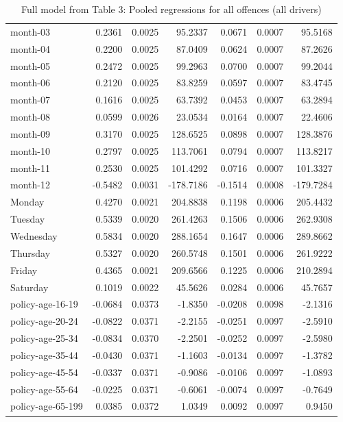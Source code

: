 \documentclass[10pt]{article}
\begin{document}
\begin{table}[ht]
\begin{tabular}{lrrrrrr}
  month-03 & 0.2361 & 0.0025 & 95.2337 & 0.0671 & 0.0007 & 95.5168 \\ 
  month-04 & 0.2200 & 0.0025 & 87.0409 & 0.0624 & 0.0007 & 87.2626 \\ 
  month-05 & 0.2472 & 0.0025 & 99.2963 & 0.0700 & 0.0007 & 99.2044 \\ 
  month-06 & 0.2120 & 0.0025 & 83.8259 & 0.0597 & 0.0007 & 83.4745 \\ 
  month-07 & 0.1616 & 0.0025 & 63.7392 & 0.0453 & 0.0007 & 63.2894 \\ 
  month-08 & 0.0599 & 0.0026 & 23.0534 & 0.0164 & 0.0007 & 22.4606 \\ 
  month-09 & 0.3170 & 0.0025 & 128.6525 & 0.0898 & 0.0007 & 128.3876 \\ 
  month-10 & 0.2797 & 0.0025 & 113.7061 & 0.0794 & 0.0007 & 113.8217 \\ 
  month-11 & 0.2530 & 0.0025 & 101.4292 & 0.0716 & 0.0007 & 101.3327 \\ 
  month-12 & -0.5482 & 0.0031 & -178.7186 & -0.1514 & 0.0008 & -179.7284 \\ 
  Monday & 0.4270 & 0.0021 & 204.8838 & 0.1198 & 0.0006 & 205.4432 \\ 
  Tuesday & 0.5339 & 0.0020 & 261.4263 & 0.1506 & 0.0006 & 262.9308 \\ 
  Wednesday & 0.5834 & 0.0020 & 288.1654 & 0.1647 & 0.0006 & 289.8662 \\ 
  Thursday & 0.5327 & 0.0020 & 260.5748 & 0.1501 & 0.0006 & 261.9222 \\ 
  Friday & 0.4365 & 0.0021 & 209.6566 & 0.1225 & 0.0006 & 210.2894 \\ 
  Saturday & 0.1019 & 0.0022 & 45.5626 & 0.0284 & 0.0006 & 45.7657 \\ 
  policy-age-16-19 & -0.0684 & 0.0373 & -1.8350 & -0.0208 & 0.0098 & -2.1316 \\ 
  policy-age-20-24 & -0.0822 & 0.0371 & -2.2155 & -0.0251 & 0.0097 & -2.5910 \\ 
  policy-age-25-34 & -0.0834 & 0.0370 & -2.2501 & -0.0252 & 0.0097 & -2.5980 \\ 
  policy-age-35-44 & -0.0430 & 0.0371 & -1.1603 & -0.0134 & 0.0097 & -1.3782 \\ 
  policy-age-45-54 & -0.0337 & 0.0371 & -0.9086 & -0.0106 & 0.0097 & -1.0893 \\ 
  policy-age-55-64 & -0.0225 & 0.0371 & -0.6061 & -0.0074 & 0.0097 & -0.7649 \\ 
  policy-age-65-199 & 0.0385 & 0.0372 & 1.0349 & 0.0092 & 0.0097 & 0.9450 \\ 
   \hline
\end{tabular}
\caption{Full model from Table 3: Pooled regressions for all offences (all drivers)} 
\label{tab_3_all_pts_A}
\end{table}
\end{document}
